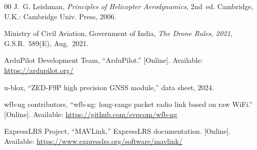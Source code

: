 \documentclass[conference]{IEEEtran}
\begin{document}
\begin{thebibliography}{00}
J.~G. Leishman,
\emph{Principles of Helicopter Aerodynamics}, 2nd~ed.
Cambridge, U.K.: Cambridge Univ. Press, 2006.

Ministry of Civil Aviation, Government of India,
\emph{The Drone Rules, 2021}, G.S.R.~589(E), Aug.~2021.

ArduPilot Development Team, ``ArduPilot.'' [Online]. Available:
\url{https://ardupilot.org/}

u-blox, ``ZED-F9P high precision GNSS module,'' data sheet, 2024.

wfb-ng contributors, ``wfb-ng: long-range packet radio link based on raw
WiFi.'' [Online]. Available: \url{https://github.com/svpcom/wfb-ng}

ExpressLRS Project, ``MAVLink,'' ExpressLRS documentation. [Online].
Available: \url{https://www.expresslrs.org/software/mavlink/}
\end{thebibliography}
\end{document}
